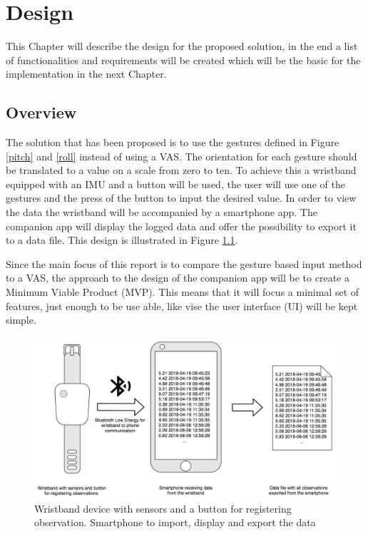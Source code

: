 \chapter{Design}\label{design_ch}
This Chapter will describe the design for the proposed solution, in the end a list of functionalities and requirements will be created which will be the basic for the implementation in the next Chapter.


\section{Overview}
The solution that has been proposed is to use the gestures defined in Figure \ref{pitch} and \ref{roll} instead of using a VAS. The orientation for each gesture should be translated to a value on a scale from zero to ten. To achieve this a wristband equipped with an IMU and a button will be used, the user will use one of the gestures and the press of the button to input the desired value. In order to view the data the wristband will be accompanied by a smartphone app. The companion app will display the logged data and offer the possibility to export it to a data file. This design is illustrated in Figure \ref{design_overview}.

Since the main focus of this report is to compare the gesture based input method to a VAS, the approach to the design of the companion app will be to create a Minimum Viable Product (MVP)\cite{mvp}. This means that it will focus a minimal set of features, just enough to be use able, like vise the user interface (UI) will be kept simple.

\begin{figure}[h]
    \centering
    \includegraphics[width=1\textwidth]{figures/design_overview.png}
    \caption{Wristband device with sensors and a button for registering observation. Smartphone to import, display and export the data}
    \label{design_overview}
\end{figure}

